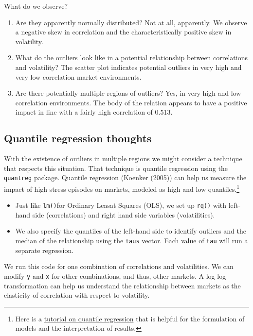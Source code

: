 \documentclass{article}
\begin{document}
What do we observe?

\begin{enumerate}
\def\labelenumi{\arabic{enumi}.}
\item
  Are they apparently normally distributed? Not at all, apparently. We
  observe a negative skew in correlation and the characteristically
  positive skew in volatility.
\item
  What do the outliers look like in a potential relationship between
  correlations and volatility? The scatter plot indicates potential
  outliers in very high and very low correlation market environments.
\item
  Are there potentially multiple regions of outliers? Yes, in very high
  and low correlation environments. The body of the relation appears to
  have a positive impact in line with a fairly high correlation of
  0.513.
\end{enumerate}

\hypertarget{quantile-regression-thoughts}{%
\subsection{Quantile regression
thoughts}\label{quantile-regression-thoughts}}

With the existence of outliers in multiple regions we might consider a
technique that respects this situation. That technique is quantile
regression using the \texttt{quantreg} package. Quantile regression
(Koenker (2005)) can help us measure the impact of high stress episodes
on markets, modeled as high and low quantiles.\footnote{Here is a
  \href{https://turing.manhattan.edu/~wfoote01/finalytics/primer-quantile-regression.html}{tutorial
  on quantile regression} that is helpful for the formulation of models
  and the interpretation of results.}

\begin{itemize}
\item
  Just like \texttt{lm()}for Ordinary Leasat Squares (OLS), we set up
  \texttt{rq()} with left-hand side (correlations) and right hand side
  variables (volatilities).
\item
  We also specify the quantiles of the left-hand side to identify
  outliers and the median of the relationship using the \texttt{taus}
  vector. Each value of \texttt{tau} will run a separate regression.
\end{itemize}

We run this code for one combination of correlations and volatilities.
We can modify \texttt{y} and \texttt{x} for other combinations, and
thus, other markets. A log-log transformation can help us understand the
relationship between markets as the elasticity of correlation with
respect to volatility.
\end{document}
